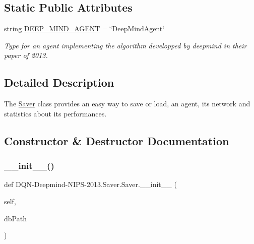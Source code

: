 \subsection*{Static Public Attributes}
\begin{DoxyCompactItemize}
\item 
string \hyperlink{classDQN-Deepmind-NIPS-2013_1_1Saver_1_1Saver_ab44237c14a7cc898a5952c42bb1fbfe0}{D\+E\+E\+P\+\_\+\+M\+I\+N\+D\+\_\+\+A\+G\+E\+NT} = \char`\"{}Deep\+Mind\+Agent\char`\"{}
\begin{DoxyCompactList}\small\item\em Type for an agent implementing the algorithm developped by deepmind in their paper of 2013. \end{DoxyCompactList}\end{DoxyCompactItemize}


\subsection{Detailed Description}
The \hyperlink{classDQN-Deepmind-NIPS-2013_1_1Saver_1_1Saver}{Saver} class provides an easy way to save or load, an agent, its network and statistics about its performances. 

\subsection{Constructor \& Destructor Documentation}
\hypertarget{classDQN-Deepmind-NIPS-2013_1_1Saver_1_1Saver_ac1c5a74d16e09f25b884196bda20f70a}{}\label{classDQN-Deepmind-NIPS-2013_1_1Saver_1_1Saver_ac1c5a74d16e09f25b884196bda20f70a} 
\subsubsection{\texorpdfstring{\+\_\+\+\_\+init\+\_\+\+\_\+()}{\_\_init\_\_()}}
{\footnotesize\ttfamily def D\+QN-\/Deepmind-\/N\+I\+PS-\/2013.Saver.\+Saver.\+\_\+\+\_\+init\+\_\+\+\_\+ (\begin{DoxyParamCaption}\item[{}]{self,  }\item[{}]{db\+Path }\end{DoxyParamCaption})}



